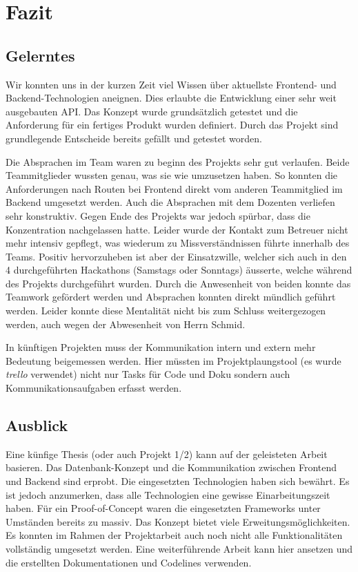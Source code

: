 \chapter{Fazit}
\label{chap:fazit}

\section{Gelerntes}
Wir konnten uns in der kurzen Zeit viel Wissen über aktuellste Frontend- und Backend-Technologien aneignen. Dies erlaubte die Entwicklung einer sehr weit ausgebauten API. Das Konzept wurde grundsätzlich getestet und die Anforderung für ein fertiges Produkt wurden definiert. Durch das Projekt sind grundlegende Entscheide bereits gefällt und getestet worden. 

Die Absprachen im Team waren zu beginn des Projekts sehr gut verlaufen. Beide Teammitglieder wussten genau, was sie wie umzusetzen haben. So konnten die Anforderungen nach Routen bei Frontend direkt vom anderen Teammitglied im Backend umgesetzt werden. Auch die Absprachen mit dem Dozenten verliefen sehr konstruktiv. Gegen Ende des Projekts war jedoch spürbar, dass die Konzentration nachgelassen hatte. Leider wurde der Kontakt zum Betreuer nicht mehr intensiv gepflegt, was wiederum zu Missverständnissen führte innerhalb des Teams. Positiv hervorzuheben ist aber der Einsatzwille, welcher sich auch in den 4 durchgeführten Hackathons (Samstags oder Sonntags) äusserte, welche während des Projekts durchgeführt wurden. Durch die Anwesenheit von beiden konnte das Teamwork gefördert werden und Absprachen konnten direkt mündlich geführt werden. Leider konnte diese Mentalität nicht bis zum Schluss weitergezogen werden, auch wegen der Abwesenheit von Herrn Schmid.

In künftigen Projekten muss der Kommunikation intern und extern mehr Bedeutung beigemessen werden. Hier müssten im Projektplaungstool (es wurde \emph{trello} verwendet) nicht nur Tasks für Code und Doku sondern auch Kommunikationsaufgaben erfasst werden.

\section{Ausblick}
Eine künfige Thesis (oder auch Projekt 1/2) kann auf der geleisteten Arbeit basieren. Das Datenbank-Konzept und die Kommunikation zwischen Frontend und Backend sind erprobt. Die eingesetzten Technologien haben sich bewährt. Es ist jedoch anzumerken, dass alle Technologien eine gewisse Einarbeitungszeit haben. Für ein Proof-of-Concept waren die eingesetzten Frameworks unter Umständen bereits zu massiv. Das Konzept bietet viele Erweitungsmöglichkeiten. Es konnten im Rahmen der Projektarbeit auch noch nicht alle Funktionalitäten vollständig umgesetzt werden. Eine weiterführende Arbeit kann hier ansetzen und die erstellten Dokumentationen und Codelines verwenden.